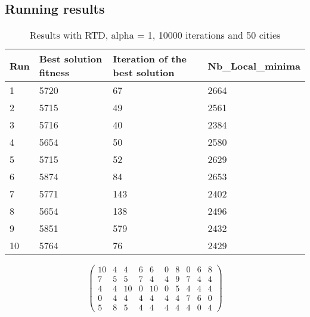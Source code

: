 \documentclass[12pt,oneside,a4paper]{article}
\begin{document}
\subsection{Running results}
\begin{table}[h]
    \centering
    \small
    \begin{tabular}{llll}
      \hline
      \multicolumn{1}{|l|}{\textbf{Run}}& \multicolumn{1}{l|}{\textbf{Best solution fitness}}& \multicolumn{1}{l|}{\textbf{Iteration of the best solution}}& \multicolumn{1}{l|}{\textbf{Nb\_Local\_minima}}\\ \hline
      \multicolumn{1}{|l|}{1} & \multicolumn{1}{l|}{5720}  & \multicolumn{1}{l|}{67} & \multicolumn{1}{l|}{2664}  \\ \hline
      \multicolumn{1}{|l|}{2} & \multicolumn{1}{l|}{5715}  & \multicolumn{1}{l|}{49} & \multicolumn{1}{l|}{2561}  \\ \hline         
      \multicolumn{1}{|l|}{3} & \multicolumn{1}{l|}{5716}  & \multicolumn{1}{l|}{40}  & \multicolumn{1}{l|}{2384}  \\ \hline
      \multicolumn{1}{|l|}{4} & \multicolumn{1}{l|}{5654}  & \multicolumn{1}{l|}{50}  & \multicolumn{1}{l|}{2580}  \\ \hline
      \multicolumn{1}{|l|}{5} & \multicolumn{1}{l|}{5715}  & \multicolumn{1}{l|}{52}  & \multicolumn{1}{l|}{2629}  \\ \hline
      \multicolumn{1}{|l|}{6} & \multicolumn{1}{l|}{5874}  & \multicolumn{1}{l|}{84}  & \multicolumn{1}{l|}{2653}  \\ \hline
      \multicolumn{1}{|l|}{7} & \multicolumn{1}{l|}{5771}  & \multicolumn{1}{l|}{143}  & \multicolumn{1}{l|}{2402}  \\ \hline
      \multicolumn{1}{|l|}{8} & \multicolumn{1}{l|}{5654}  & \multicolumn{1}{l|}{138} & \multicolumn{1}{l|}{2496}  \\ \hline
      \multicolumn{1}{|l|}{9} & \multicolumn{1}{l|}{5851}  & \multicolumn{1}{l|}{579} & \multicolumn{1}{l|}{2432}  \\ \hline
      \multicolumn{1}{|l|}{10} & \multicolumn{1}{l|}{5764}  & \multicolumn{1}{l|}{76} & \multicolumn{1}{l|}{2429}  \\ \hline
    \end{tabular}
    \caption{Results with RTD, alpha = 1, 10000 iterations and 50 cities}
  \end{table}

  \begin{equation}
    \begin{pmatrix} 10 & 4 & 4 & 6 & 6 & 0 & 8 & 0 & 6 & 8 \\
                    7 & 5 & 5 & 7 & 4 & 4 & 9 & 7 & 4 & 4 \\
                    4 & 4 & 10 & 0 & 10 & 0 & 5 & 4 & 4 & 4\\
                    0 & 4 & 4 & 4 & 4 & 4 & 4 & 7 & 6 & 0 \\
                    5 & 8 & 5 & 4 & 4 & 4 & 4 & 4 & 0 & 4 
    \end{pmatrix}
  \end{equation}
\end{document}
